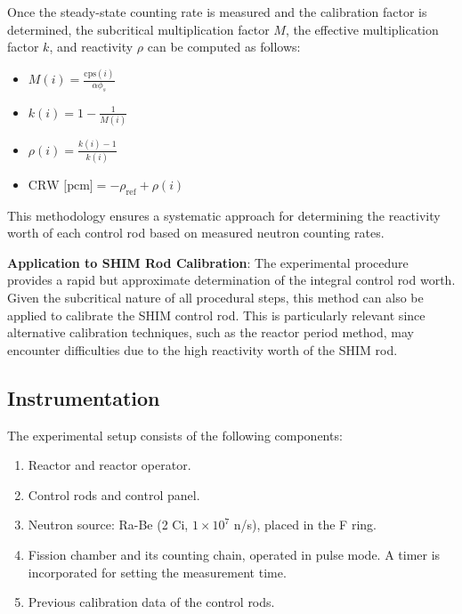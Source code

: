Once the steady-state counting rate is measured and the calibration factor is determined, the subcritical multiplication factor $ M $, the effective multiplication factor $ k $, and reactivity $ \rho $ can be computed as follows:
\begin{itemize}
    \item $ M(i) = \frac{\text{cps}(i)}{\alpha \phi_s} $
    \item $ k(i) = 1 - \frac{1}{M(i)} $
    \item $ \rho(i) = \frac{k(i) - 1}{k(i)} $
    \item $ \text{CRW} \text{ [pcm]} = -\rho_{\text{ref}} + \rho(i) $
\end{itemize}

This methodology ensures a systematic approach for determining the reactivity worth of each control rod based on measured neutron counting rates.


\begin{tcolorbox}[boxstyle2]
    \textbf{Application to SHIM Rod Calibration}:
    The experimental procedure provides a rapid but approximate determination of the integral control rod worth. Given the subcritical nature of all procedural steps, this method can also be applied to calibrate the SHIM control rod. This is particularly relevant since alternative calibration techniques, such as the reactor period method, may encounter difficulties due to the high reactivity worth of the SHIM rod.
\end{tcolorbox}


\subsection{Instrumentation}

The experimental setup consists of the following components:

\begin{enumerate}
    \item Reactor and reactor operator.
    \item Control rods and control panel.
    \item Neutron source: Ra-Be (2 Ci, $1 \times 10^7$ n/s), placed in the F ring.
    \item Fission chamber and its counting chain, operated in pulse mode. A timer is incorporated for setting the measurement time.
    \item Previous calibration data of the control rods.
\end{enumerate}


